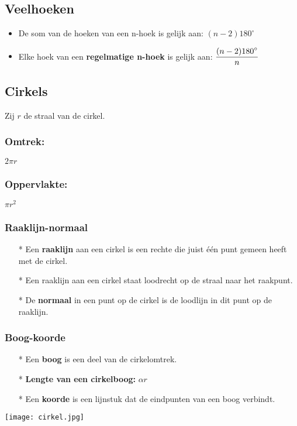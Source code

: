\subsection{Veelhoeken} \label{veelhoeken}
\hypertarget{veelhoeken}{}
	\begin{itemize}%
	\item De som van de hoeken van een n-hoek is gelijk aan: $(n-2)180^{\circ}$
	\item Elke hoek van een {\bf regelmatige n-hoek} is gelijk aan: $\displaystyle\frac{\displaystyle (n-	2)180^{\circ}}{\displaystyle n}$
	\end{itemize}%

\subsection{Cirkels} \label{cirkels}
\hypertarget{cirkels}{}
Zij $r$ de straal van de cirkel.\newline

\subsubsection{Omtrek:} \label{omtrek_cirkel}
\hypertarget{omtrek_cirkel}{}
$2\pi r$ 

\subsubsection{Oppervlakte:}\label{oppervlakte_cirkel}
\hypertarget{oppervlakte_cirkel}{}
$\pi r^2$

\subsubsection{Raaklijn-normaal} \label{raaklijn-normaal}
\hypertarget{raaklijn-normaal}{}
	\begin{itemize}
	\item[*] Een {\bf raaklijn} aan een cirkel is een rechte die juist \'e\'en punt gemeen 	heeft met de cirkel.
	\item[*] Een raaklijn aan een cirkel staat loodrecht op de straal naar het raakpunt.
	\item[*] De {\bf normaal} in een punt op de cirkel is de loodlijn in dit punt op de 	raaklijn.
	\end{itemize}

\subsubsection{Boog-koorde} \label{boog-koorde}
\hypertarget{boog-koorde}{}
	\begin{itemize}
	\item[*]Een {\bf boog} is een deel van de cirkelomtrek.
	\item[*]{\bf Lengte van een \hypertarget{cirkelboog}{cirkelboog}:} $\alpha r$\label{cirkelboog}\newline
	\item[*]Een {\bf koorde} is een lijnstuk dat de eindpunten van een boog verbindt.
	\end{itemize}
        \texttt{[image: cirkel.jpg]}

